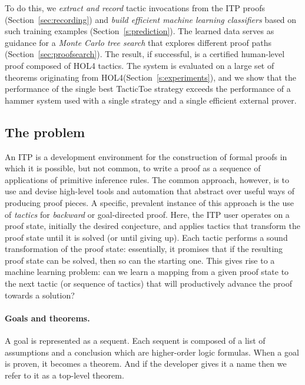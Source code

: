 \documentclass[runningheads,a4paper,draft]{svjour3}
\newcommand{\todoi}[1]{\todo[inline]{#1}}
\def\holfour{\textsf{HOL4}\xspace}
\def\tactictoe{\textsf{TacticToe}\xspace}
\begin{document}
\todoi{Rewrite the plan}
  To do this, we \emph{extract and record} tactic invocations from the ITP
  proofs (Section~\ref{sec:recording}) and
  \emph{build efficient machine learning classifiers} based on such training
  examples (Section~\ref{s:prediction}).  The learned data serves as
  guidance for a \emph{Monte Carlo tree search} that explores different
  proof paths (Section~\ref{sec:proofsearch}). The result, if
  successful, is a certified human-level proof composed of \holfour
  tactics.  The system is evaluated on a large set of theorems originating
  from \holfour (Section~\ref{s:experiments}), and we show that the performance
  of the single best \tactictoe strategy exceeds the performance of a hammer
  system used with a single strategy and a single efficient external prover.


\subsection{The problem}
An ITP is a development environment for the construction of formal proofs in which it is possible, but not common, to write a proof as a sequence of applications of primitive inference rules.
The common approach, however, is to use and devise high-level tools and automation that abstract over useful ways of producing proof pieces.
A specific, prevalent instance of this approach is the use of \emph{tactics} for \emph{backward} or goal-directed proof.
Here, the ITP user operates on a proof state, initially the desired conjecture, and applies tactics that transform the proof state until it is solved (or until giving up).
Each tactic performs a sound transformation of the proof state: essentially, it promises that if the resulting proof state can be solved, then so can the starting one.
This gives rise to a machine learning problem: can we learn a mapping from a given proof state to the next tactic (or sequence of tactics) that will productively advance the proof towards a solution?

\paragraph{Goals and theorems.}
A goal is represented as a sequent. Each sequent is composed of
a list of assumptions and a conclusion which are higher-order logic formulas.
When a goal is proven, it becomes a theorem. And if the developer gives it a
name then we refer to it as a top-level theorem.
\end{document}

